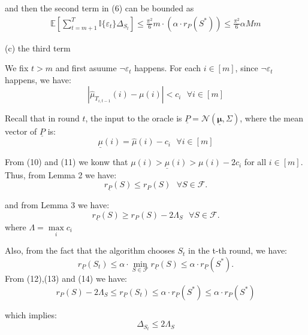 \documentclass[opre,sglanonrev]{informs4}
\begin{document}
\begin{appendices}
and then the second term in (6) can be bounded as
\begin{equation}
	\begin{aligned}
		\mathbb{E}[\sum_{t=m+1}^{T}\mathbb{I}\{\varepsilon_t\}\Delta_{S_t}]\leq \frac{\pi^2}{6}m \cdot (\alpha \cdot r_P(S^*)) \leq \frac{\pi^2}{6}\alpha M m
	\end{aligned}
\end{equation}

(c) the third term 

We fix $t>m$ and first asuume $\lnot \varepsilon_t$ happens. For each $i \in [m]$, since $\lnot \varepsilon_t$ happens, we have:
\begin{equation}
	|\hat{\mu}_{T_{i,t-1}}(i)-\mu(i)| < c_i ~~~ \forall i \in [m]
\end{equation}

Recall that in round $t$, the input to the oracle is $\underline{P} = \mathcal{N}(\underline{\boldsymbol{\mu}},\Sigma)$, where the mean vector of $\underline{P}$ is:
\begin{equation}
	\underline{\mu}(i) = \hat{\mu}(i)-c_i ~~~ \forall i \in [m]
\end{equation}

From (10) and (11) we  konw that $\mu(i)>\underline{\mu}(i)>\mu(i)-2c_i$ for all $i \in [m]$. Thus, from Lemma 2 we have:
\begin{equation}
	r_{\underline{P}}(S)\leq r_P(S) ~~~ \forall S \in \mathcal{F}.
\end{equation}

and from Lemma 3 we have:
\begin{equation}
	r_{\underline{P}}(S)\geq r_P(S)-2\Lambda_S ~~~ \forall S \in \mathcal{F}.
\end{equation}
where $\Lambda = \mathop{\max}\limits_{i}c_i$

Also, from the fact that the algorithm chooses $S_t$ in the t-th round, we have:
\begin{equation}
	r_{\underline{P}}(S_t)\leq \alpha \cdot \mathop{\min}\limits_{S \in \mathcal{F}}r_{\underline{P}}(S) \leq \alpha \cdot r_{\underline{P}}(S^*).
\end{equation}
From (12),(13) and (14) we have:
\begin{equation}
	r_P(S)-2\Lambda_S \leq r_{\underline{P}}(S_t) \leq \alpha \cdot r_{\underline{P}}(S^*) \leq \alpha \cdot r_P(S^*)
\end{equation}

which implies:
$$
	\Delta_{S_t} \leq 2\Lambda_S
$$


\end{appendices}
\end{document}
